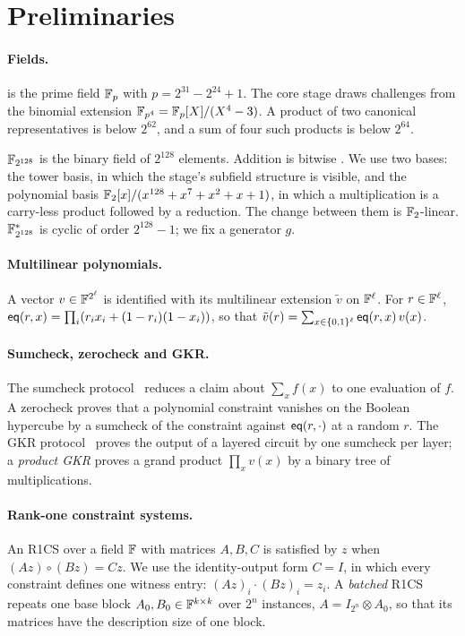 \section{Preliminaries}\label{sec:prelim}

\paragraph{Fields.} \KB{} is the prime field $\mathbb{F}_{p}$ with $p = 2^{31} - 2^{24} + 1$. The core stage draws challenges from the binomial extension $\mathbb{F}_{p^4} = \mathbb{F}_{p}[X]/(X^4 - 3)$. A product of two canonical \KB{} representatives is below $2^{62}$, and a sum of four such products is below $2^{64}$.

$\mathbb{F}_{2^{128}}$ is the binary field of $2^{128}$ elements. Addition is bitwise \XOR{}. We use two bases: the tower basis, in which the stage's subfield structure is visible, and the polynomial basis $\mathbb{F}_{2}[x]/(x^{128}+x^7+x^2+x+1)$, in which a multiplication is a carry-less product followed by a reduction. The change between them is $\mathbb{F}_{2}$-linear. $\mathbb{F}_{2^{128}}^{*}$ is cyclic of order $2^{128}-1$; we fix a generator $g$.

\paragraph{Multilinear polynomials.} A vector $v \in \mathbb{F}^{2^\ell}$ is identified with its multilinear extension $\tilde v$ on $\mathbb{F}^\ell$. For $r \in \mathbb{F}^\ell$, $\mathsf{eq}(r, x) = \prod_i (r_i x_i + (1-r_i)(1-x_i))$, so that $\tilde v(r) = \sum_{x \in \{0,1\}^\ell} \mathsf{eq}(r,x)\,v(x)$.

\paragraph{Sumcheck, zerocheck and GKR.} The sumcheck protocol~\citep{lund1992algebraic} reduces a claim about $\sum_x f(x)$ to one evaluation of $f$. A zerocheck proves that a polynomial constraint vanishes on the Boolean hypercube by a sumcheck of the constraint against $\mathsf{eq}(r,\cdot)$ at a random $r$. The GKR protocol~\citep{gkr-cmt} proves the output of a layered circuit by one sumcheck per layer; a \emph{product GKR} proves a grand product $\prod_x v(x)$ by a binary tree of multiplications.

\paragraph{Rank-one constraint systems.} An R1CS over a field $\mathbb{F}$ with matrices $A,B,C$ is satisfied by $z$ when $(Az)\circ(Bz) = Cz$. We use the identity-output form $C = I$, in which every constraint defines one witness entry: $(Az)_i \cdot (Bz)_i = z_i$. A \emph{batched} R1CS repeats one base block $A_0, B_0 \in \mathbb{F}^{k\times k}$ over $2^n$ instances, $A = I_{2^n} \otimes A_0$, so that its matrices have the description size of one block.

